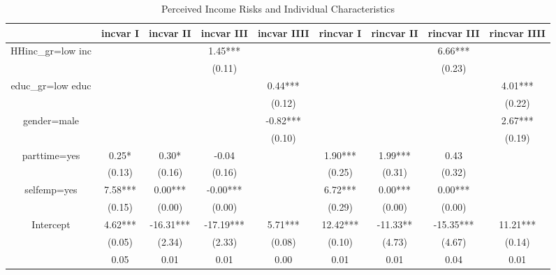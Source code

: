 
\begin{table}[p]
\centering
\begin{adjustbox}{width=\textwidth}
\begin{threeparttable}
\caption{Perceived Income Risks and Individual Characteristics}
\label{micro_reg}\begin{tabular}{ccccccccc}
\toprule
{} & incvar I &  incvar II & incvar III & incvar IIII & rincvar I & rincvar II & rincvar III & rincvar IIII \\
\midrule
HHinc\_gr=low inc &          &            &    1.45*** &             &           &            &     6.66*** &              \\
                 &          &            &     (0.11) &             &           &            &      (0.23) &              \\
educ\_gr=low educ &          &            &            &     0.44*** &           &            &             &      4.01*** \\
                 &          &            &            &      (0.12) &           &            &             &       (0.22) \\
gender=male      &          &            &            &    -0.82*** &           &            &             &      2.67*** \\
                 &          &            &            &      (0.10) &           &            &             &       (0.19) \\
parttime=yes     &    0.25* &      0.30* &      -0.04 &             &   1.90*** &    1.99*** &        0.43 &              \\
                 &   (0.13) &     (0.16) &     (0.16) &             &    (0.25) &     (0.31) &      (0.32) &              \\
selfemp=yes      &  7.58*** &    0.00*** &   -0.00*** &             &   6.72*** &    0.00*** &     0.00*** &              \\
                 &   (0.15) &     (0.00) &     (0.00) &             &    (0.29) &     (0.00) &      (0.00) &              \\
Intercept        &  4.62*** &  -16.31*** &  -17.19*** &     5.71*** &  12.42*** &   -11.33** &   -15.35*** &     11.21*** \\
                 &   (0.05) &     (2.34) &     (2.33) &      (0.08) &    (0.10) &     (4.73) &      (4.67) &       (0.14) \\
                 &     0.05 &       0.01 &       0.01 &        0.00 &      0.01 &       0.01 &        0.04 &         0.01 \\

\end{tabular}
\end{threeparttable}
\end{adjustbox}
\end{table}
